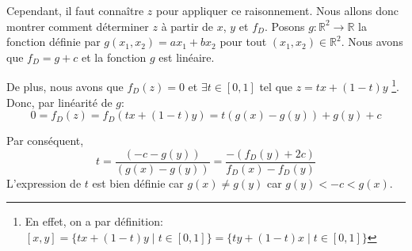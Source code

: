 Cependant, il faut connaître $z$ pour appliquer ce raisonnement. Nous allons
donc montrer comment déterminer $z$ à partir de $x$, $y$ et $f_D$.
Posons $g: \mathbb{R}^2 \to \mathbb{R}$ la fonction définie par
$g (x_1, x_2) =  a x_1 + b x_2$ pour tout $(x_1, x_2)\in\mathbb{R}^2$.
Nous avons que $f_D = g + c $ et la fonction $g$ est linéaire.

De plus, nous avons que $f_D(z) = 0$ et $\exists t \in [0,1]$ tel que
$ z = tx+ (1-t)y$
\footnote{En effet, on a par définition:
  $[x, y] = \{tx + (1 - t)y\mid t\in [0,1]\}=\{ty + (1 - t)x\mid t\in [0,1]\}$}.
Donc, par linéarité de $g$:
\begin{equation}
  0 = f_D(z)  = f_D (tx+ (1-t)y) = t(g(x)-g(y))+g(y)+c
\end{equation}

Par conséquent,
\begin{equation} \label{eq:t}
    t = \frac{(-c - g(y))}{(g(x)-g(y))} = \frac{-(f_D(y)+2c)}{f_D(x)-f_D(y)}
\end{equation}
L'expression de $t$ est bien définie car  $g(x) \neq g(y)$ car
$ g(y) < -c < g(x)$.
